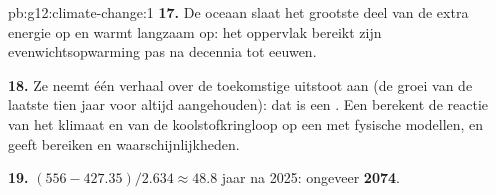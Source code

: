 \begin{solution}{pb:g12:climate-change:1}
\textbf{17.} De oceaan slaat het grootste deel van de extra energie op en warmt langzaam op: het
oppervlak bereikt zijn evenwichtsopwarming pas na decennia tot eeuwen.

\textbf{18.} Ze neemt één verhaal over de toekomstige uitstoot aan (de groei van de
laatste tien jaar voor altijd aangehouden): dat is een . Een  berekent de
reactie van het klimaat en van de koolstofkringloop op een 
met fysische modellen, en geeft bereiken en waarschijnlijkheden.

\textbf{19.} $(556 - 427.35)/2.634 \approx 48.8$ jaar na 2025: ongeveer
\textbf{2074}.
\end{solution}
